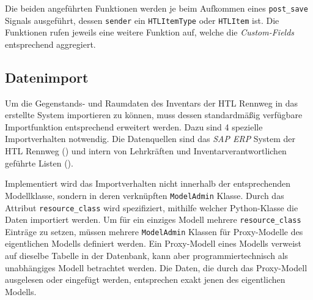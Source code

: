 Die beiden angeführten Funktionen werden je beim Aufkommen eines
\texttt{post\_save} Signals \cite{django-doku-signals} ausgeführt,
dessen \texttt{sender} ein \texttt{HTLItemType} oder \texttt{HTLItem}
ist. Die Funktionen rufen jeweils eine weitere Funktion auf, welche die
\emph{Custom-Fields} entsprechend aggregiert.

\hypertarget{datenimport}{%
\subsection{Datenimport}\label{datenimport}}

Um die Gegenstands- und Raumdaten des Inventars der HTL Rennweg in das
erstellte System importieren zu können, muss dessen standardmäßig
verfügbare Importfunktion entsprechend erweitert werden. Dazu sind 4
spezielle Importverhalten notwendig. Die Datenquellen sind das
\emph{SAP ERP}
System der HTL Rennweg () und
intern von Lehrkräften und Inventarverantwortlichen geführte Listen
().

Implementiert wird das Importverhalten nicht innerhalb der
entsprechenden Modellklasse, sondern in deren verknüpften
\texttt{ModelAdmin} Klasse. Durch das Attribut \texttt{resource\_class}
wird spezifiziert, mithilfe welcher Python-Klasse die Daten importiert
werden. Um für ein einziges Modell mehrere \texttt{resource\_class}
Einträge zu setzen, müssen mehrere \texttt{ModelAdmin} Klassen für
Proxy-Modelle \cite{django-doku-models} des eigentlichen Modells
definiert werden. Ein Proxy-Modell eines Modells verweist auf dieselbe
Tabelle in der Datenbank, kann aber programmiertechnisch als
unabhängiges Modell betrachtet werden. Die Daten, die durch das
Proxy-Modell ausgelesen oder eingefügt werden, entsprechen exakt jenen
des eigentlichen Modells.

\begin{Shaded}
\begin{Highlighting}[]
\OperatorTok{=} 

\NormalTok{())}
\NormalTok{())}

\OperatorTok{=}
\end{Highlighting}
\end{Shaded}

